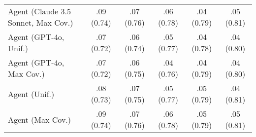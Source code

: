 \begin{table}[h!]
\begin{tabular}{lccccc}
    Agent (Claude 3.5 Sonnet, Max Cov.) & .09 {\small (0.74)} & .07 {\small (0.76)} & .06 {\small (0.78)} & .04 {\small (0.79)} & .05 {\small (0.81)} \\
    Agent (GPT-4o, Unif.) & .07 {\small (0.72)} & .06 {\small (0.74)} & .05 {\small (0.77)} & .04 {\small (0.78)} & .04 {\small (0.80)} \\
    Agent (GPT-4o, Max Cov.) & .07 {\small (0.72)} & .06 {\small (0.75)} & .04 {\small (0.76)} & .04 {\small (0.79)} & .04 {\small (0.80)} \\
    Agent (Unif.) & .08 {\small (0.73)} & .07 {\small (0.75)} & .05 {\small (0.77)} & .05 {\small (0.79)} & .04 {\small (0.81)} \\
    Agent (Max Cov.) & .09 {\small (0.74)} & .07 {\small (0.76)} & .06 {\small (0.78)} & .05 {\small (0.79)} & .05 {\small (0.81)} \\
    \bottomrule
    \end{tabular}
\end{table}